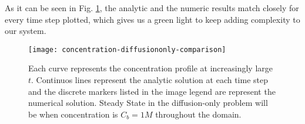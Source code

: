 As it can be seen in Fig. \ref{fig:diffusion-comparison}, the analytic and the numeric results match closely for every time step plotted, which gives us a green light to keep adding complexity to our system.
 
\begin{figure}[htbp]
\centering
\texttt{[image: concentration-diffusiononly-comparison]}
\caption{Each curve represents the concentration profile at increasingly large $t$. Continuos lines represent the analytic solution at each time step and the discrete markers listed in the image legend are represent the numerical solution. Steady State in the diffusion-only problem will be when concentration is $C_b=1M$ throughout the domain.}
\label{fig:diffusion-comparison}
\end{figure}


\newpage
